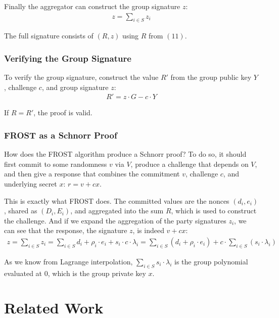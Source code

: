 \documentclass{article}
\begin{document}
Finally the aggregator can construct the group signature $z$:
\begin{align}
  z = \sum_{i \in S}^{} z_i
\end{align}

The full signature consists of $(R, z)$ using $R$ from $(11)$.

\subsubsection{
  Verifying the Group Signature
}

To verify the group signature, construct the value $R'$ from the group public key $Y$, challenge $c$, and group signature $z$:
\begin{align}
  R' = z \cdot G - c \cdot Y
\end{align}

If $R = R'$, the proof is valid.

\subsubsection{
  FROST as a Schnorr Proof
}

How does the FROST algorithm produce a Schnorr proof?  To do so, it should first commit to some randomness $v$ via $V$, produce a challenge that depends on $V$, and then give a response that combines the commitment $v$, challenge $c$, and underlying secret $x$: $r = v + cx$.

This is exactly what FROST does.  The committed values are the nonces $(d_i, e_i)$, shared as $(D_i, E_i)$, and aggregated into the sum $R$, which is used to construct the challenge.  And if we expand the aggregation of the party signatures $z_i$, we can see that the response, the signature $z$, is indeed $v + cx$:
\begin{align}
  z = \sum_{i \in S}^{} z_i = \sum_{i \in S}^{} d_i + \rho_i \cdot e_i + s_i \cdot c \cdot \lambda_i = \sum_{i \in S}^{} (d_i + \rho_i \cdot e_i) + c \cdot \sum_{i \in S}^{}(s_i \cdot \lambda_i)\nonumber
\end{align}

As we know from Lagrange interpolation, $\sum_{i \in S}^{} s_i \cdot \lambda_i$ is the group polynomial evaluated at $0$, which is the group private key $x$.

\newpage
\onecolumn
\section{
  Related Work
}
\end{document}
